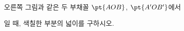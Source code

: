 \noindent\begin{minipage}[t]{0.58\linewidth}\vspace{0pt}\raggedright 오른쪽 그림과 같은 두 부채꼴 $\pt{AOB}$, $\pt{A'OB'}$에서 \par\smallskip\end{minipage}\hfill\begin{minipage}[t]{0.4\linewidth}\vspace{0pt}\centering \resizebox{\ifdim\width>\linewidth\linewidth\else\width\fi}{!}{}\end{minipage}\par
\noindent {}\par\smallskip\noindent 일 때, 색칠한 부분의 넓이를 구하시오.
